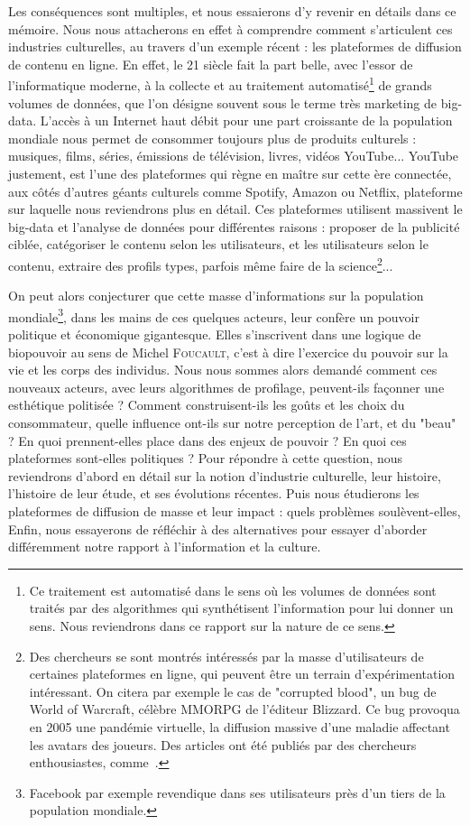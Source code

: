 \documentclass[a4paper,14pt]{extreport}
\begin{document}
Les conséquences sont multiples, et nous essaierons d'y revenir en détails dans ce mémoire. Nous nous attacherons en effet à comprendre comment s'articulent ces industries culturelles, au travers d'un exemple récent : les plateformes de diffusion de contenu en ligne. En effet, le 21 siècle fait la part belle, avec l'essor de l'informatique moderne, à la collecte et au traitement automatisé\footnote{Ce traitement est automatisé dans le sens où les volumes de données sont traités par des algorithmes qui synthétisent l'information pour lui donner un sens. Nous reviendrons dans ce rapport sur la nature de ce sens.} de grands volumes de données, que l'on désigne souvent sous le terme très marketing de \gls{big-data}. L'accès à un Internet haut débit pour une part croissante de la population mondiale nous permet de consommer toujours plus de produits culturels : musiques, films, séries, émissions de télévision, livres, vidéos YouTube... YouTube justement, est l'une des plateformes qui règne en maître sur cette ère connectée, aux côtés d'autres géants culturels comme Spotify, Amazon ou Netflix, plateforme sur laquelle nous reviendrons plus en détail. Ces plateformes utilisent massivent le \gls{big-data} et l'analyse de données pour différentes raisons : proposer de la publicité ciblée, catégoriser le contenu selon les utilisateurs, et les utilisateurs selon le contenu, extraire des profils types, parfois même faire de la science\footnote{Des chercheurs se sont montrés intéressés par la masse d'utilisateurs de certaines plateformes en ligne, qui peuvent être un terrain d'expérimentation intéressant. On citera par exemple le cas de "corrupted blood", un bug de World of Warcraft, célèbre MMORPG de l'éditeur Blizzard. Ce bug provoqua en 2005 une pandémie virtuelle, la diffusion massive d'une maladie affectant les avatars des joueurs. Des articles ont été publiés par des chercheurs enthousiastes, comme~\cite{wow_pandemic}.}...

On peut alors conjecturer que cette masse d'informations sur la population mondiale\footnote{Facebook par exemple revendique dans ses utilisateurs près d'un tiers de la population mondiale.}, dans les mains de ces quelques acteurs, leur confère un pouvoir politique et économique gigantesque. Elles s'inscrivent dans une logique de biopouvoir au sens de Michel \textsc{Foucault}, c'est à dire l'exercice du pouvoir sur la vie et les corps des individus. Nous nous sommes alors demandé comment ces nouveaux acteurs, avec leurs algorithmes de profilage, peuvent-ils façonner une esthétique politisée ? Comment construisent-ils les goûts et les choix du consommateur, quelle influence ont-ils sur notre perception de l'art, et du "beau" ? En quoi prennent-elles place dans des enjeux de pouvoir ? En quoi ces plateformes sont-elles politiques ? Pour répondre à cette question, nous reviendrons d'abord en détail sur la notion d'industrie culturelle, leur histoire, l'histoire de leur étude, et ses évolutions récentes. Puis nous étudierons les plateformes de diffusion de masse et leur impact : quels problèmes soulèvent-elles,  Enfin, nous essayerons de réfléchir à des alternatives pour essayer d'aborder différemment notre rapport à l'information et la culture.
\end{document}
